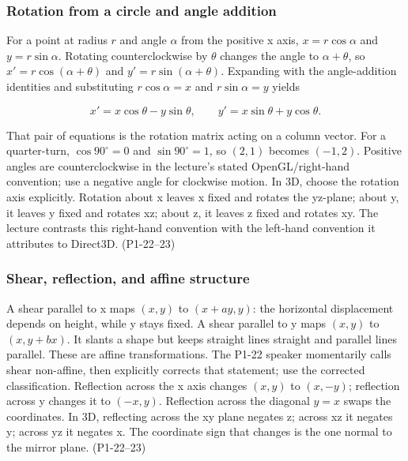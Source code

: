 \subsubsection{Rotation from a circle and angle addition}\label{03-visual-computing-i-ch001-rotation-from-a-circle-and-angle-addition}

For a point at radius \(r\) and angle \(\alpha\) from the positive x axis, \(x=r\cos\alpha\) and \(y=r\sin\alpha\). Rotating counterclockwise by \(\theta\) changes the angle to \(\alpha+\theta\), so \(x'=r\cos(\alpha+\theta)\) and \(y'=r\sin(\alpha+\theta)\). Expanding with the angle-addition identities and substituting \(r\cos\alpha=x\) and \(r\sin\alpha=y\) yields

\[
x'=x\cos\theta-y\sin\theta,\qquad y'=x\sin\theta+y\cos\theta.
\]

That pair of equations is the rotation matrix acting on a column vector. For a quarter-turn, \(\cos90^\circ=0\) and \(\sin90^\circ=1\), so \((2,1)\) becomes \((-1,2)\). Positive angles are counterclockwise in the lecture's stated OpenGL/right-hand convention; use a negative angle for clockwise motion. In 3D, choose the rotation axis explicitly. Rotation about x leaves x fixed and rotates the yz-plane; about y, it leaves y fixed and rotates xz; about z, it leaves z fixed and rotates xy. The lecture contrasts this right-hand convention with the left-hand convention it attributes to Direct3D. (P1-22--23)

\subsubsection{Shear, reflection, and affine structure}\label{03-visual-computing-i-ch001-shear-reflection-and-affine-structure}

A shear parallel to x maps \((x,y)\) to \((x+ay,y)\): the horizontal displacement depends on height, while y stays fixed. A shear parallel to y maps \((x,y)\) to \((x,y+bx)\). It slants a shape but keeps straight lines straight and parallel lines parallel. These are affine transformations. The P1-22 speaker momentarily calls shear non-affine, then explicitly corrects that statement; use the corrected classification. Reflection across the x axis changes \((x,y)\) to \((x,-y)\); reflection across y changes it to \((-x,y)\). Reflection across the diagonal \(y=x\) swaps the coordinates. In 3D, reflecting across the xy plane negates z; across xz it negates y; across yz it negates x. The coordinate sign that changes is the one normal to the mirror plane. (P1-22--23)

